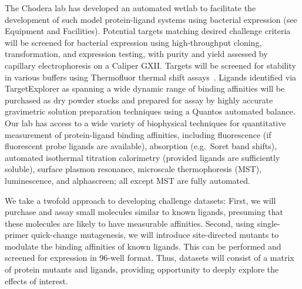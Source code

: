\documentclass[11pt]{article}
\begin{document}
The Chodera lab has developed an automated wetlab to facilitate the development of such model protein-ligand systems using bacterial expression (see Equipment and Facilities).
Potential targets matching desired challenge criteria will be screened for bacterial expression using high-throughput cloning, transformation, and expression testing, with purity and yield assessed by capillary electrophoresis on a Caliper GXII.
Targets will be screened for stability in various buffers using Thermofluor thermal shift assays~\cite{Reinhard:2013:ActaCrystallographicaSectionFStructuralBiologyandCrystallizationCommunications}.
Ligands identified via TargetExplorer as spanning a wide dynamic range of binding affinities will be purchased as dry powder stocks and prepared for assay by highly accurate gravimetric solution preparation techniques using a Quantos automated balance.
Our lab has access to a wide variety of biophysical techniques for quantitative measurement of protein-ligand binding affinities, including fluorescence (if fluorescent probe ligands are available), absorption (e.g.~Soret band shifts), automated isothermal titration calorimetry (provided ligands are sufficiently soluble), surface plasmon resonance, microscale thermophoresis (MST), luminescence, and alphascreen; all except MST are fully automated. 

We take a twofold approach to developing challenge datasets:
First, we will purchase and assay small molecules similar to known ligands, presuming that these molecules are likely to have measurable affinities.
Second, using single-primer quick-change mutagenesis, we will introduce site-directed mutants to modulate the binding affinities of known ligands.
This can be performed and screened for expression in 96-well format.
Thus, datasets will consist of a matrix of protein mutants and ligands, providing opportunity to deeply explore the effects of interest.
\end{document}
